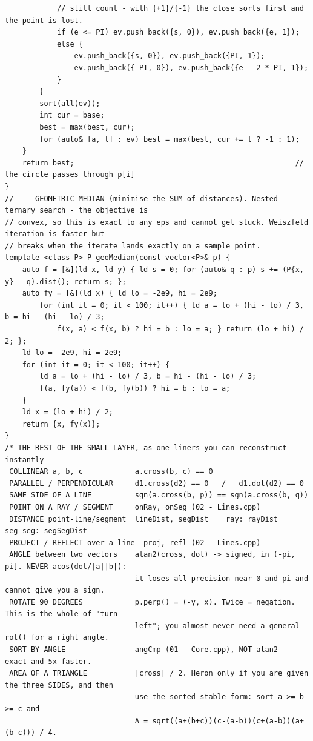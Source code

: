 \documentclass[9pt,a4paper,twocolumn]{extarticle}
\begin{document}
\begin{lstlisting}
            // still count - with {+1}/{-1} the close sorts first and the point is lost.
            if (e <= PI) ev.push_back({s, 0}), ev.push_back({e, 1});
            else {
                ev.push_back({s, 0}), ev.push_back({PI, 1});
                ev.push_back({-PI, 0}), ev.push_back({e - 2 * PI, 1});
            }
        }
        sort(all(ev));
        int cur = base;
        best = max(best, cur);
        for (auto& [a, t] : ev) best = max(best, cur += t ? -1 : 1);
    }
    return best;                                                   // the circle passes through p[i]
}
// --- GEOMETRIC MEDIAN (minimise the SUM of distances). Nested ternary search - the objective is
// convex, so this is exact to any eps and cannot get stuck. Weiszfeld iteration is faster but
// breaks when the iterate lands exactly on a sample point.
template <class P> P geoMedian(const vector<P>& p) {
    auto f = [&](ld x, ld y) { ld s = 0; for (auto& q : p) s += (P{x, y} - q).dist(); return s; };
    auto fy = [&](ld x) { ld lo = -2e9, hi = 2e9;
        for (int it = 0; it < 100; it++) { ld a = lo + (hi - lo) / 3, b = hi - (hi - lo) / 3;
            f(x, a) < f(x, b) ? hi = b : lo = a; } return (lo + hi) / 2; };
    ld lo = -2e9, hi = 2e9;
    for (int it = 0; it < 100; it++) {
        ld a = lo + (hi - lo) / 3, b = hi - (hi - lo) / 3;
        f(a, fy(a)) < f(b, fy(b)) ? hi = b : lo = a;
    }
    ld x = (lo + hi) / 2;
    return {x, fy(x)};
}
/* THE REST OF THE SMALL LAYER, as one-liners you can reconstruct instantly
 COLLINEAR a, b, c            a.cross(b, c) == 0
 PARALLEL / PERPENDICULAR     d1.cross(d2) == 0   /   d1.dot(d2) == 0
 SAME SIDE OF A LINE          sgn(a.cross(b, p)) == sgn(a.cross(b, q))
 POINT ON A RAY / SEGMENT     onRay, onSeg (02 - Lines.cpp)
 DISTANCE point-line/segment  lineDist, segDist    ray: rayDist    seg-seg: segSegDist
 PROJECT / REFLECT over a line  proj, refl (02 - Lines.cpp)
 ANGLE between two vectors    atan2(cross, dot) -> signed, in (-pi, pi]. NEVER acos(dot/|a||b|):
                              it loses all precision near 0 and pi and cannot give you a sign.
 ROTATE 90 DEGREES            p.perp() = (-y, x). Twice = negation. This is the whole of "turn
                              left"; you almost never need a general rot() for a right angle.
 SORT BY ANGLE                angCmp (01 - Core.cpp), NOT atan2 - exact and 5x faster.
 AREA OF A TRIANGLE           |cross| / 2. Heron only if you are given the three SIDES, and then
                              use the sorted stable form: sort a >= b >= c and
                              A = sqrt((a+(b+c))(c-(a-b))(c+(a-b))(a+(b-c))) / 4.

\end{lstlisting}
\end{document}

